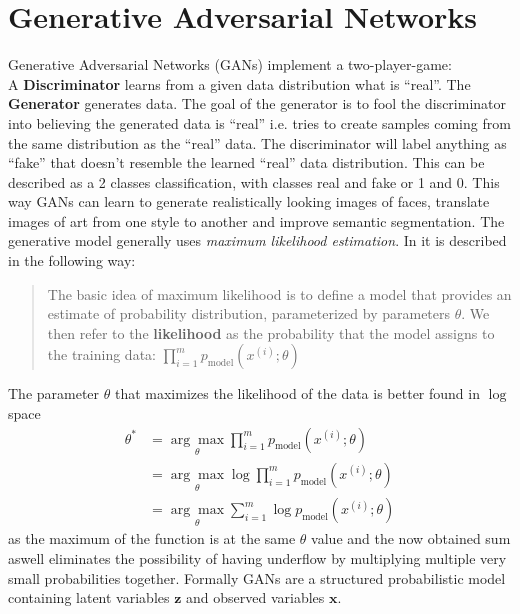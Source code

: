 \section{Generative Adversarial Networks}
Generative Adversarial Networks (GANs) implement a two-player-game:\\
A \textbf{Discriminator} learns from a given data distribution what is ``real''. The \textbf{Generator} generates data. The goal of the generator is to fool the discriminator into believing the generated data is ``real'' i.e. tries to create samples coming from the same distribution as the ``real'' data. The discriminator will label anything as ``fake'' that doesn't resemble the learned ``real'' data distribution. This can be described as a 2 classes classification, with classes real and fake or 1 and 0. This way GANs can learn to generate realistically looking images of faces, translate images of art from one style to another and improve semantic segmentation. The generative model generally uses \textit{maximum likelihood estimation}. In \cite{DBLP:journals/corr/Goodfellow17} it is described in the following way:
\begin{quote}
	The basic idea of maximum likelihood is to define a model that provides an estimate of probability distribution, parameterized by parameters $\theta$. We then refer to the \textbf{likelihood} as the probability that the model assigns to the training data: $\prod_{i=1}^{m}p_{\text{model}}(x^{(i)}; \theta)$
\end{quote}
The parameter $\theta$ that maximizes the likelihood of the data is better found in $\log$ space
\begin{align}
	\theta^* &= \underset{\theta}{\arg \max} \prod_{i = 1}^{m} p_{\text{model}} (x^{(i)}; \theta)\\
	&= \underset{\theta}{\arg \max} \log \prod_{i=1}^{m} p_{\text{model}}(x^{(i)}; \theta)\\
	&= \underset{\theta}{\arg \max} \sum_{i = 1}^{m} \log p_{\text{model}}(x^{(i)}; \theta)
\end{align}
as the maximum of the function is at the same $\theta$ value and the now obtained sum aswell eliminates the possibility of having underflow by multiplying multiple very small probabilities together. 
Formally GANs are a structured probabilistic model containing latent variables $\mathbf{z}$ and observed variables $\mathbf{x}$.
